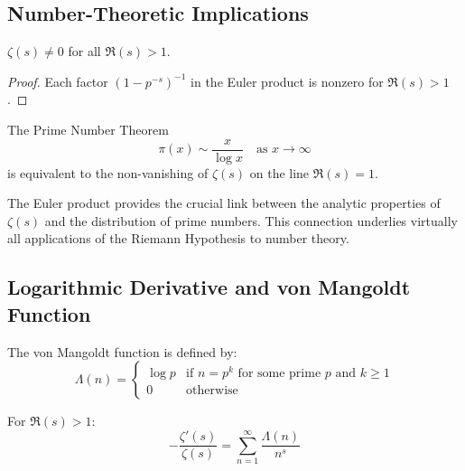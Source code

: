\subsection{Number-Theoretic Implications}

\begin{corollary}
\label{cor:nonvanishing_right}
$\zeta(s) \neq 0$ for all $\Re(s) > 1$.
\end{corollary}

\begin{proof}
Each factor $(1-p^{-s})^{-1}$ in the Euler product is nonzero for $\Re(s) > 1$.
\end{proof}

\begin{theorem}
\label{thm:pnt_connection}
The Prime Number Theorem
\begin{equation}
\pi(x) \sim \frac{x}{\log x} \quad \text{as } x \to \infty
\end{equation}
is equivalent to the non-vanishing of $\zeta(s)$ on the line $\Re(s) = 1$.
\end{theorem}

\begin{highlight}
The Euler product provides the crucial link between the analytic properties of $\zeta(s)$ and the distribution of prime numbers. This connection underlies virtually all applications of the Riemann Hypothesis to number theory.
\end{highlight}

\subsection{Logarithmic Derivative and von Mangoldt Function}

\begin{definition}
\label{def:vonmangoldt}
The von Mangoldt function is defined by:
\begin{equation}
\Lambda(n) = \begin{cases}
\log p & \text{if } n = p^k \text{ for some prime } p \text{ and } k \geq 1 \\
0 & \text{otherwise}
\end{cases}
\end{equation}
\end{definition}

\begin{theorem}
\label{thm:logarithmic_derivative}
For $\Re(s) > 1$:
\begin{equation}
-\frac{\zeta'(s)}{\zeta(s)} = \sum_{n=1}^{\infty} \frac{\Lambda(n)}{n^s}
\label{eq:logarithmic_derivative}
\end{equation}
\end{theorem}

